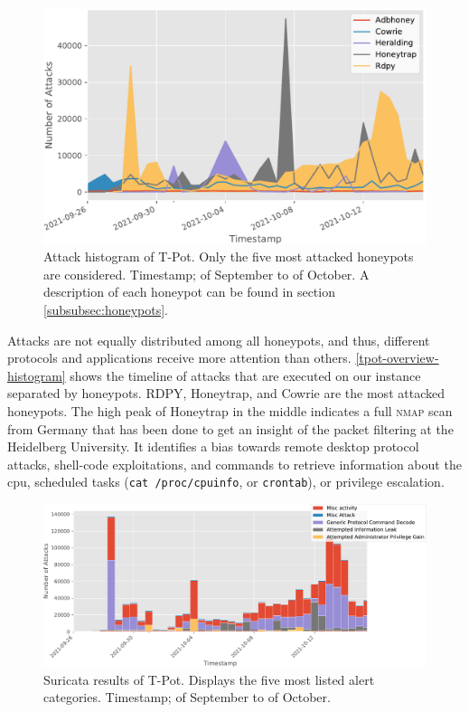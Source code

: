 \begin{figure}[htbp]
    \centering
    \includegraphics[width=\textwidth]{figures/tpot-attacks-histogram.pdf}
    \caption[Attack histogram of T-Pot]{
        Attack histogram of T-Pot.
        Only the five most attacked honeypots are considered.
        Timestamp;  of September to  of October.
        A description of each honeypot can be found in section \ref{subsubsec:honeypots}.
    }
    \label{tpot-overview-histogram}
\end{figure}

Attacks are not equally distributed among all honeypots, and thus, different protocols and applications receive more attention than others.
\autoref{tpot-overview-histogram} shows the timeline of attacks that are executed on our instance separated by honeypots.
RDPY, Honeytrap, and Cowrie are the most attacked honeypots.
The high peak of Honeytrap in the middle indicates a full \textsc{nmap} scan from Germany that has been done to get an insight of the packet filtering at the Heidelberg University.
It identifies a bias towards remote desktop protocol attacks, shell-code exploitations, and commands to retrieve information about the \acs{cpu}, scheduled tasks (\verb|cat /proc/cpuinfo|, or \verb|crontab|), or privilege escalation.

\begin{figure}[htbp]
    \centering
    \includegraphics[width=\textwidth]{figures/tpot-suricata-alerts.pdf}
    \caption[Suricata results of T-Pot]{
        Suricata results of T-Pot.
        Displays the five most listed alert categories.
        Timestamp;  of September to  of October.
    }
    \label{fig:suricata-results}
\end{figure}

